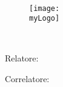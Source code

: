 \begin{titlepage}
    \begin{center}
        \spacedlowsmallcaps{\myUni} \\
        \bigskip\myFaculty \\
        \medskip\mySchool \\
    	\medskip\myDepartment \\
    	\bigskip\myCourseFirstPartIT \\
        \medskip\myCourseSecondPartIT \\  

        \hfill

        \vfill
        
        \begin{figure}[!h]
			\begin{center}
				\texttt{[image: \\myLogo]} %
			\end{center}
		\end{figure}
		
		\vfill

        \begingroup
       		\LARGE %
            \color{Maroon} \myTitleIT \\ \bigskip
        \endgroup

        \vfill

		\flushleft 
		\small{Relatore:}\\ %
		\medskip\spacedlowsmallcaps{\mySupervisor}

		\flushleft
		\small{Correlatore:}\\ %
		\medskip\spacedlowsmallcaps{\myOtherSupervisor}\\
        

\end{center}
\end{titlepage}
